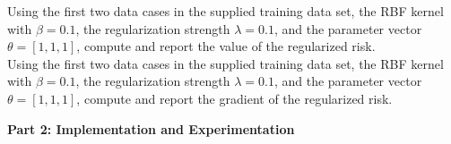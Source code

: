 \documentclass[11pt]{article}
\begin{document}
\begin{problem}{20}
 Using the first two data cases in the supplied training data set, the RBF kernel with $\beta=0.1$, the regularization strength $\lambda=0.1$, and the parameter vector $\theta=[1,1,1]$, compute and report the value of the regularized risk.\\

 Using the first two data cases in the supplied training data set, the RBF kernel with $\beta=0.1$, the regularization strength $\lambda=0.1$, and the parameter vector $\theta=[1,1,1]$, compute and report the gradient of the regularized risk.\\

\end{problem}

\vspace{1em}
\textbf{Part 2: Implementation and Experimentation}
\end{document}
